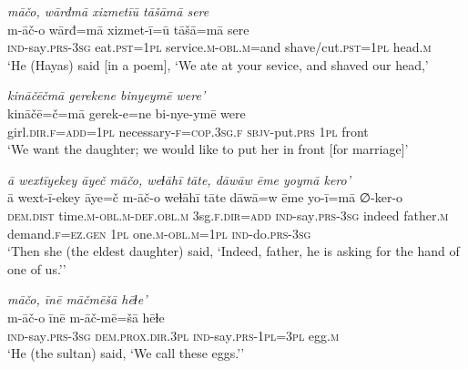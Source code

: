 \ea \label{ŽH.55}
\textit{māčo, wārđmā xizmetīū tāšāmā sere} \\ 
\gll m-āč-o wārđ=mā xizmet-ī=ū tāšā=mā sere \\ 
 \textsc{ind-}say\textsc{.prs}\textsc{-3sg} eat\textsc{.pst}\textsc{=1pl} service\textsc{.m}\textsc{-obl}\textsc{.m}=and shave/cut\textsc{.pst}\textsc{=1pl} head\textsc{.m} \\ 
\glt `He (Hayas) said [in a poem], ‘We ate at your sevice, and shaved our head,'
\z 
 
\ea \label{ŽH.56}
\textit{kināčēčmā gerekene binyeymē were’} \\ 
\gll kināčē=č=mā gerek-e=ne bi-nye-ymē were \\ 
 girl\textsc{.dir}\textsc{\textsc{.f}}\textsc{=add}\textsc{=1pl} necessary\textsc{-f}\textsc{=cop}\textsc{.3sg}\textsc{\textsc{.f}} \textsc{sbjv-}put\textsc{.prs} \textsc{1pl} front \\ 
\glt `We want the daughter; we would like to put her in front [for marriage]'
\z 
 
\ea \label{ŽH.57}
\textit{ā wextīyekey āyeč māčo, weɫāhī tāte, dāwāw ēme yoymā kero’} \\ 
\gll ā wext-ī-ekey āye=č m-āč-o weɫāhī tāte dāwā=w ēme yo-ī=mā ∅-ker-o \\ 
 \textsc{dem.dist} time\textsc{.m}\textsc{-obl}\textsc{.m}\textsc{-def}\textsc{.obl}\textsc{.m} 3sg\textsc{\textsc{.f}}\textsc{.dir}\textsc{=add} \textsc{ind-}say\textsc{.prs}\textsc{-3sg} indeed father\textsc{.m} demand\textsc{\textsc{.f}}\textsc{=ez}\textsc{.gen} \textsc{1pl} one\textsc{.m}\textsc{-obl}\textsc{.m}\textsc{=1pl} \textsc{ind-}do\textsc{.prs}\textsc{-3sg} \\ 
\glt `Then she (the eldest daughter) said, ‘Indeed, father, he is asking for the hand of one of us.’'
\z 
 
\ea \label{ŽH.87}
\textit{māčo, īnē māčmēšā hēɫe’} \\ 
\gll m-āč-o īnē m-āč-mē=šā hēɫe \\ 
 \textsc{ind-}say\textsc{.prs}\textsc{-3sg} \textsc{dem.prox}\textsc{.dir}\textsc{.3pl} \textsc{ind-}say\textsc{.prs}\textsc{-1pl}\textsc{=3pl} egg\textsc{.m} \\ 
\glt `He (the sultan) said, ‘We call these eggs.’'
\z 
 
